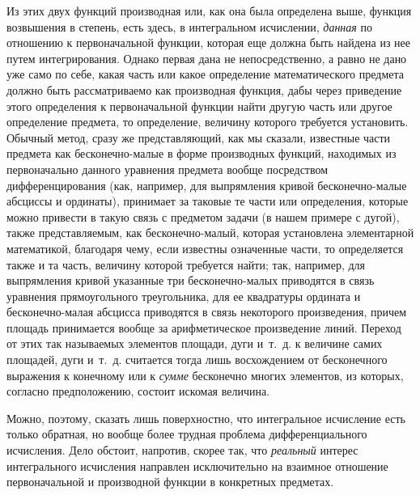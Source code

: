 Из этих двух функций производная или, как она была определена выше, функция
возвышения в степень, есть здесь, в интегральном исчислении, {\em данная} по
отношению к первоначальной функции, которая еще должна быть найдена из нее
путем интегрирования. Однако первая дана не непосредственно, а равно не дано
уже само по себе, какая часть или какое определение математического предмета
должно быть рассматриваемо как производная функция, дабы через приведение этого
определения к первоначальной функции найти другую часть или другое определение
предмета, то определение, величину которого требуется установить. Обычный
метод, сразу же представляющий, как мы сказали, известные части предмета как
бесконечно-малые в форме производных функций, находимых из первоначально
данного уравнения предмета вообще посредством дифференцирования (как, например,
для выпрямления кривой бесконечно-малые абсциссы и ординаты), принимает за
таковые те части или определения, которые можно привести в такую связь с
предметом задачи (в нашем примере с дугой), также представляемым, как
бесконечно-малый, которая установлена элементарной математикой, благодаря чему,
если известны означенные части, то определяется также и та часть, величину
которой требуется найти; так, например, для выпрямления кривой указанные три
бесконечно-малых приводятся в связь уравнения прямоугольного треугольника, для
ее квадратуры ордината и бесконечно-малая абсцисса приводятся в связь
некоторого произведения, причем площадь принимается вообще за арифметическое
произведение линий. Переход от этих так называемых элементов площади, дуги
и~т.~д. к величине самих площадей, дуги и~т.~д. считается тогда лишь
восхождением от бесконечного выражения к конечному или к {\em сумме} бесконечно
многих элементов, из которых, согласно предположению, состоит искомая величина.

Можно, поэтому, сказать лишь поверхностно, что интегральное исчисление есть
только обратная, но вообще более трудная проблема дифференциального исчисления.
Дело обстоит, напротив, скорее так, что {\em реальный} интерес интегрального
исчисления направлен исключительно на взаимное отношение первоначальной и
производной функции в конкретных предметах.

